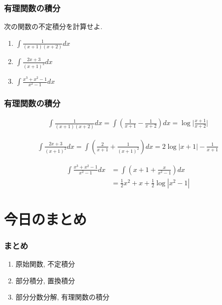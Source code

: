 \begin{frame}
\frametitle{有理関数の積分}

\begin{Prob}
次の関数の不定積分を計算せよ. 
\begin{enumerate}
\item $\int \frac{1}{(x+1)(x+2)} dx$
\item $\int \frac{2x+3}{(x+1)^2} dx$
\item $\int \frac{x^3+x^2-1}{x^2-1}dx$
\end{enumerate}
\end{Prob}

\end{frame}




\begin{frame}
\frametitle{有理関数の積分}

\begin{align*}
\int \frac{1}{(x+1)(x+2)} dx  = \int (\frac{1}{x+1}-\frac{1}{x+2})dx = \log\Big|\frac{x+1}{x+2}\Big|
\end{align*}

\begin{align*}
\int \frac{2x+3}{(x+1)^2} dx  = \int (\frac{2}{x+1}+\frac{1}{(x+1)^2})dx = 2\log|x+1| - \frac{1}{x+1}
\end{align*}

\begin{align*}
\int \frac{x^3+x^2-1}{x^2-1}dx & = \int (x+1 +\frac{x}{x^2-1})dx \\
& = \frac{1}{2}x^2+x+\frac{1}{2}\log|x^2-1|
\end{align*}

\end{frame}









\section{今日のまとめ}
\begin{frame}
\frametitle{まとめ}   


\begin{enumerate}
\item 原始関数, 不定積分
\item 部分積分, 置換積分
\item 部分分数分解, 有理関数の積分
\end{enumerate} 

\end{frame}